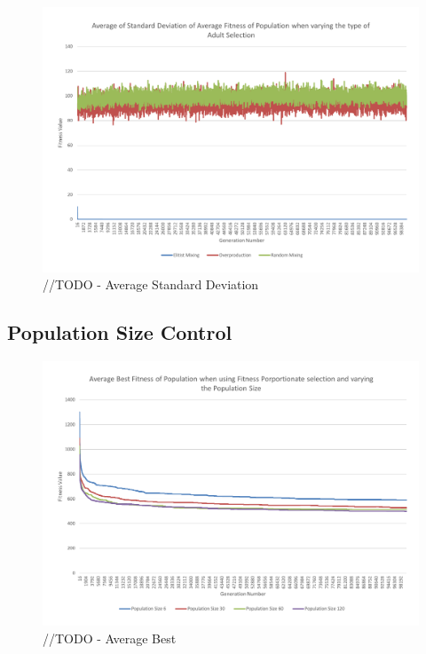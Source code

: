 \begin{figure}
	\centerline{\includegraphics[width=\paperwidth]{figures/CircleTests/CircleTestAdultSelectionAverageStandardDeviation.pdf}}
	\caption{//TODO - Average Standard Deviation}
\end{figure}

\subsection{Population Size Control} %
\label{sub:population_size_control}
\begin{figure}
	\centerline{\includegraphics[width=\paperwidth]{figures/CircleTests/CirclePopulationSizeControllAverageBest.pdf}}
	\caption{//TODO - Average Best}
\end{figure}


